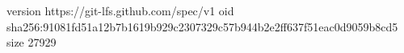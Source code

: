 version https://git-lfs.github.com/spec/v1
oid sha256:91081fd51a12b7b1619b929c2307329c57b944b2e2ff637f51eac0d9059b8cd5
size 27929
